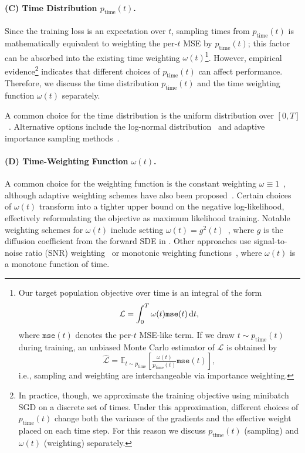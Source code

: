 \paragraph{(C) Time Distribution $p_{\text{time}}(t)$.} Since the training loss is an expectation over $t$, sampling times from $p_{\mathrm{time}}(t)$ is mathematically equivalent to weighting the per-$t$ MSE by $p_{\mathrm{time}}(t)$; this factor can be absorbed into the existing time weighting $\omega(t)$\footnote{Our target population objective over time is an integral of the form
\[
\mathcal{L} = \int_{0}^{T} \omega(t)\mathtt{mse}(t)\mathop{}\!\mathrm{d} t,
\]
where $\mathtt{mse}(t)$ denotes the per-$t$ MSE-like term.
If we draw $t\sim p_{\mathrm{time}}(t)$ during training, an unbiased Monte Carlo estimator of $\mathcal{L}$ is obtained by
\[
\widehat{\mathcal{L}} = \mathbb{E}_{t\sim p_{\mathrm{time}}} \left[ \tfrac{\omega(t)}{p_{\mathrm{time}}(t)} \mathtt{mse}(t) \right],
\]
i.e., sampling and weighting are interchangeable via importance weighting.}.  However, empirical evidence\footnote{In practice, though, we approximate the training objective using minibatch SGD on 
a discrete set of times. Under this approximation, different choices of 
$p_{\mathrm{time}}(t)$ change both the variance of the gradients and the 
effective weight placed on each time step. For this reason we discuss 
$p_{\mathrm{time}}(t)$ (sampling) and $\omega(t)$ (weighting) separately.} indicates that different choices of $p_{\mathrm{time}}(t)$ can affect performance. Therefore, we discuss the time distribution $p_{\mathrm{time}}(t)$ and the time weighting function $\omega(t)$ separately. 

A common choice for the time distribution is the uniform distribution over $[0,T]$~\citep{ho2020denoising,song2020score,lipman2022flow,liu2022rectified}. Alternative options include the log-normal distribution~\citep{karras2022elucidating} and adaptive importance sampling methods~\citep{song2021maximum,kingma2021variational}.



\paragraph{(D) Time-Weighting Function $\omega(t)$.} A common choice for the weighting function is the constant weighting $\omega \equiv 1$~\citep{ho2020denoising,karras2022elucidating,lipman2022flow,liu2022rectified}, although adaptive weighting schemes have also been proposed~\citep{karras2023analyzing}. Certain choices of $\omega(t)$ transform  into a tighter upper bound on the negative log-likelihood, effectively reformulating the objective as maximum likelihood training. Notable weighting schemes for $\omega(t)$ include setting $\omega(t) = g^2(t)$~\citep{song2021maximum}, where $g$ is the diffusion coefficient from the forward SDE in . Other approaches use signal-to-noise ratio (SNR) weighting~\citep{kingma2021variational} or monotonic weighting functions~\citep{kingma2023understanding}, where $\omega(t)$ is a monotone function of time.

